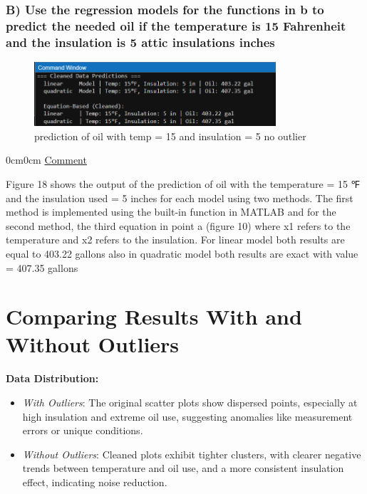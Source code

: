 \documentclass[12pt]{article}
\begin{document}
\subsubsection*{B) Use the regression models for the functions in b to predict the needed oil if the
temperature is 15 Fahrenheit and the insulation is 5 attic insulations inches}


\begin{figure}[H]
    \centering
    \includegraphics[width=0.8\textwidth]{18.png}
    \caption{prediction of oil with temp = 15 and insulation = 5 no outlier}
\end{figure}
\begin{adjustwidth} {0cm}{0cm}
\uline{Comment}
\end{adjustwidth}
Figure 18 shows the output of the prediction of oil with the temperature = 15 ℉ and the
insulation used = 5 inches for each model using two methods. The first method is
implemented using the built-in function in MATLAB and for the second method, the third
equation in point a (figure 10) where x1 refers to the temperature and x2 refers to the
insulation. For linear model both results are equal to 403.22 gallons also in quadratic
model both results are exact with value = 407.35 gallons

\newpage

\section*{Comparing Results With and Without Outliers}

\checkmark \textbf{Data Distribution:}
\begin{itemize}
    \item \textit{With Outliers}: The original scatter plots show dispersed points, especially at high insulation and extreme oil use, suggesting anomalies like measurement errors or unique conditions.
    \item \textit{Without Outliers}: Cleaned plots exhibit tighter clusters, with clearer negative trends between temperature and oil use, and a more consistent insulation effect, indicating noise reduction.
\end{itemize}
\end{document}
